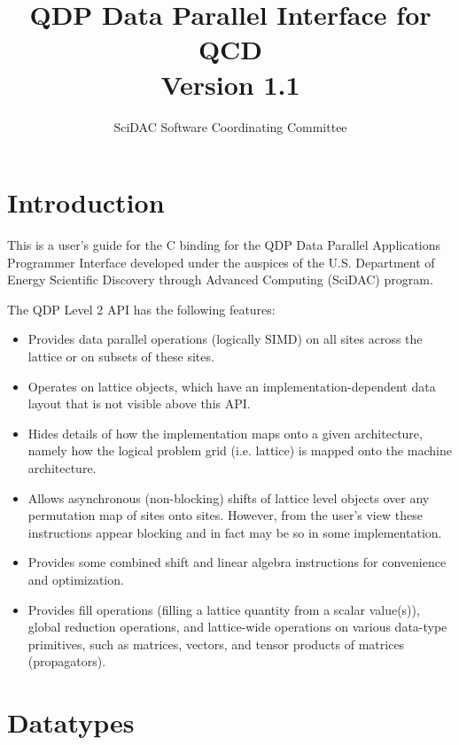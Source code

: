\documentclass{article}
\begin{document}
\title{
   QDP Data Parallel Interface for QCD \\{\large Version 1.1}
}
\author{ SciDAC Software Coordinating Committee}

\maketitle
\section{Introduction}
This is a user's guide for the C binding for the QDP Data Parallel
Applications Programmer Interface developed under the auspices of the
U.S. Department of Energy Scientific Discovery through Advanced
Computing (SciDAC) program.

The QDP Level 2 API has the following features:
\begin{itemize}
\item Provides data parallel operations (logically SIMD) on all sites
across the lattice or on subsets of these sites.
\item Operates on lattice objects, which have an
implementation-dependent data layout that is not visible above this
API.
\item Hides details of how the implementation maps onto a given
architecture, namely how the logical problem grid (i.e. lattice) is
mapped onto the machine architecture.
\item Allows asynchronous (non-blocking) shifts of lattice level
objects over any permutation map of sites onto sites. However, from
the user's view these instructions appear blocking and in fact may be
so in some implementation.
\item Provides some combined shift and linear algebra instructions for
convenience and optimization.
\item Provides fill operations (filling a lattice quantity from a
scalar value(s)), global reduction operations, and lattice-wide
operations on various data-type primitives, such as matrices, vectors,
and tensor products of matrices (propagators).
\end{itemize}

\section{Datatypes}
\label{sec.datatypes}
\end{document}
